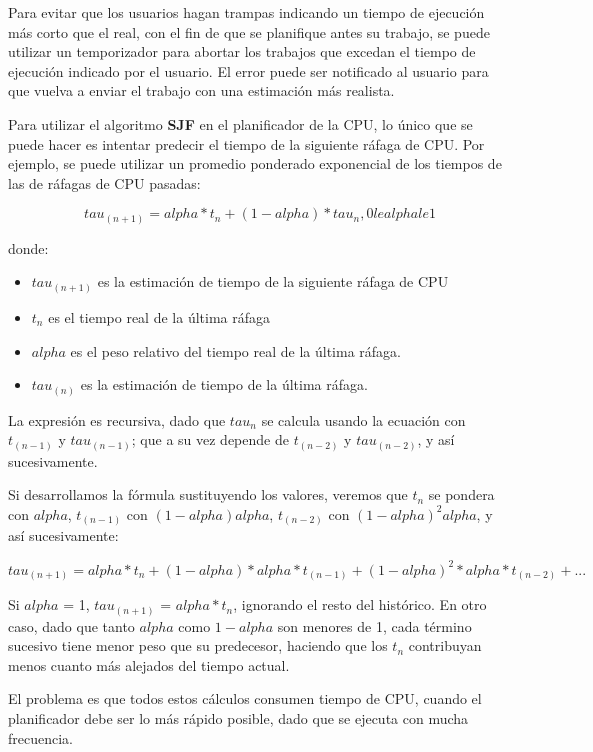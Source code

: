 Para evitar que los usuarios hagan trampas indicando un tiempo de
ejecución más corto que el real, con el fin de que se planifique antes
su trabajo, se puede utilizar un temporizador para abortar los trabajos
que excedan el tiempo de ejecución indicado por el usuario. El error
puede ser notificado al usuario para que vuelva a enviar el trabajo con
una estimación más realista.

Para utilizar el algoritmo \textbf{SJF} en el planificador de la CPU, lo
único que se puede hacer es intentar predecir el tiempo de la siguiente
ráfaga de CPU. Por ejemplo, se puede utilizar un promedio ponderado
exponencial de los tiempos de las de ráfagas de CPU pasadas:

\[tau_(n+1) = alpha*t_n + (1 - alpha)*tau_n, 0 le alpha le 1\]

donde:

\begin{itemize}
\item
  \(tau_(n+1)\) es la estimación de tiempo de la siguiente ráfaga de CPU
\item
  \(t_n\) es el tiempo real de la última ráfaga
\item
  \(alpha\) es el peso relativo del tiempo real de la última ráfaga.
\item
  \(tau_(n)\) es la estimación de tiempo de la última ráfaga.
\end{itemize}

La expresión es recursiva, dado que \(tau_n\) se calcula usando la
ecuación con \(t_(n-1)\) y \(tau_(n-1)\); que a su vez depende de
\(t_(n-2)\) y \(tau_(n-2)\), y así sucesivamente.

Si desarrollamos la fórmula sustituyendo los valores, veremos que
\(t_n\) se pondera con \(alpha\), \(t_(n-1)\) con \((1 - alpha)alpha\),
\(t_(n-2)\) con \((1 - alpha)^2alpha\), y así sucesivamente:

\[tau_(n+1) = alpha*t_n + (1 - alpha)*alpha*t_(n-1) + (1 - alpha)^2*alpha*t_(n-2) + ...\]

Si \(alpha\) = 1, \(tau_(n+1)\) = \(alpha*t_n\), ignorando el resto del
histórico. En otro caso, dado que tanto \(alpha\) como \(1 - alpha\) son
menores de 1, cada término sucesivo tiene menor peso que su predecesor,
haciendo que los \(t_n\) contribuyan menos cuanto más alejados del
tiempo actual.

El problema es que todos estos cálculos consumen tiempo de CPU, cuando
el planificador debe ser lo más rápido posible, dado que se ejecuta con
mucha frecuencia.

